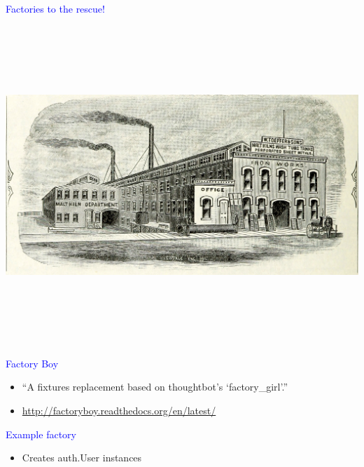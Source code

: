 \documentclass[landscape]{slides}
\begin{document}
\begin{slide}
    \textcolor{blue}{\Large{Factories to the rescue!}}
    \begin{center}
        \includegraphics[height=12cm]{factory}
    \end{center}
\end{slide}


\begin{slide}
    \textcolor{blue}{\Large{Factory Boy}}

    \begin{itemize}
        \item ``A fixtures replacement based on thoughtbot's `factory\_girl'.''
        \item \url{http://factoryboy.readthedocs.org/en/latest/}
    \end{itemize}
\end{slide}



\begin{slide}
    \textcolor{blue}{\Large{Example factory}}

    \begin{itemize}
        \item Creates auth.User instances
    \end{itemize}
\end{slide}
\end{document}
